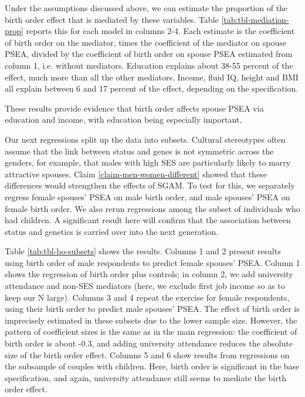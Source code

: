 \documentclass[
]{article}
\theoremstyle{definition}
\theoremstyle{definition}
\theoremstyle{definition}
\theoremstyle{definition}
\theoremstyle{remark}
\begin{document}
Under the assumptions discussed above, we can estimate the proportion of
the birth order effect that is mediated by these variables. Table
\ref{tab:tbl-mediation-prop} reports this for each model in columns
2-4. Each estimate is the coefficient of birth order on the mediator,
times the coefficient of the mediator on spouse PSEA, divided by the
coefficient of birth order on spouse PSEA estimated from column 1, i.e.
without mediators. Education explains about 38-55 percent of the effect, much more
than all the other mediators. Income, fluid IQ, height and BMI all explain
between 6 and 17 percent of the effect, depending on the specification.

These results provide evidence that birth order affects spouse PSEA via
education and income, with education being especially important.

Our next regressions split up the data into subsets. Cultural
stereotypes often assume that the link between status and genes is not
symmetric across the genders, for example, that males with high SES are
particularly likely to marry attractive spouses. Claim \ref{claim-men-women-different} showed that these differences would strengthen
the effects of SGAM.
To test for this, we
separately regress female spouses' PSEA on male birth order, and male
spouses' PSEA on female birth order. We also rerun regressions among the
subset of individuals who had children. A significant result here will
confirm that the association between status and genetics is carried over
into the next generation.

Table \ref{tab:tbl-bo-subsets} shows the results. Columns 1 and 2 present
results using birth order of male respondents to predict female spouses' PSEA.
Column 1 shows the regression of birth order plus controls; in column 2, we add
university attendance and non-SES mediators (here, we exclude first job income
so as to keep our N large). Columns 3 and 4 repeat the exercise for female
respondents, using their birth order to predict male spouses' PSEA. The effect of
birth order is imprecisely estimated in these subsets due to the lower sample
size. However, the pattern of coefficient sizes is the same as in the main
regression: the coefficient of birth order is about -0.3, and adding university
attendance reduces the absolute size of the birth order effect. Columns 5 and 6
show results from regressions on the subsample of couples with children.
Here, birth order is significant in the base specification, and again,
university attendance still seems to mediate the birth order effect.
\end{document}
